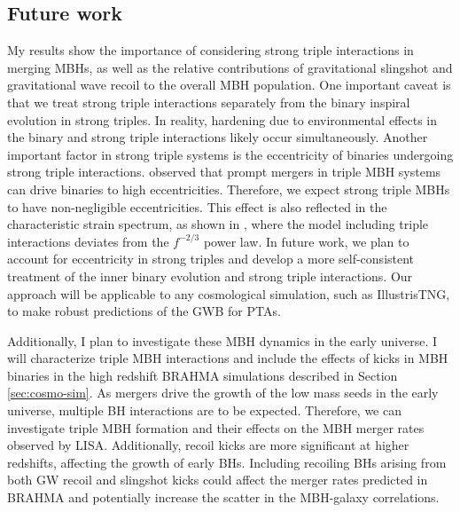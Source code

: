 \documentclass[11pt, letterpaper]{article}
\begin{document}
\subsection{Future work}
\label{sec:future-work-dynamics}

My results show the importance of considering strong triple interactions in merging MBHs, as well as the relative contributions of gravitational slingshot and gravitational wave recoil to the overall MBH population.  One important caveat is that we treat strong triple interactions separately from the binary inspiral evolution in strong triples. In reality, hardening due to environmental effects in the binary and strong triple interactions likely occur simultaneously. Another important factor in strong triple systems is the eccentricity of binaries undergoing strong triple interactions. \cite{bonetti_post-newtonian_2018-1} observed that prompt mergers in triple MBH systems can drive binaries to high eccentricities. Therefore, we expect strong triple MBHs to have non-negligible eccentricities. This effect is also reflected in the characteristic strain spectrum, as shown in \cite{bonetti_post-newtonian_2018}, where the model including triple interactions deviates from the $f^{-2/3}$ power law. In future work, we plan to account for eccentricity in strong triples and develop a more self-consistent treatment of the inner binary evolution and strong triple interactions. Our approach will be applicable to any cosmological simulation, such as IllustrisTNG, to make robust predictions of the GWB for PTAs. 


Additionally, I plan to investigate these MBH dynamics in the early universe. I will characterize triple MBH interactions and include the effects of kicks in MBH binaries in the high redshift BRAHMA simulations \cite{bhowmick2024introducingbrahmasimulationsuite, bhowmick2024growthhighredshiftsupermassive} described in Section \ref{sec:cosmo-sim}. As mergers drive the growth of the low mass seeds in the early universe, multiple BH interactions are to be expected. Therefore, we can investigate triple MBH formation and their effects on the MBH merger rates observed by LISA. Additionally, recoil kicks are more significant at higher redshifts, affecting the growth of early BHs. Including recoiling BHs arising from both GW recoil and slingshot kicks could affect the merger rates predicted in BRAHMA and potentially increase the scatter in the MBH-galaxy correlations.
\end{document}
